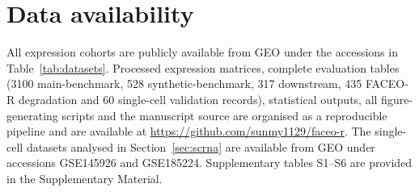 \documentclass[twocolumn,10pt,a4paper]{article}
\begin{document}
\section*{Data availability}
All expression cohorts are publicly available from GEO under the accessions in
Table~\ref{tab:datasets}. Processed expression matrices, complete evaluation tables (3100
main-benchmark, 528 synthetic-benchmark, 317 downstream, 435 FACEO-R degradation and 60
single-cell validation records), statistical outputs, all figure-generating scripts and the
manuscript source are organised as a reproducible pipeline and are available at
\url{https://github.com/sunmy1129/faceo-r}. The single-cell datasets analysed in
Section~\ref{sec:scrna} are available from GEO under accessions GSE145926 and GSE185224.
Supplementary tables
S1--S6 are provided in the Supplementary Material.
\end{document}
